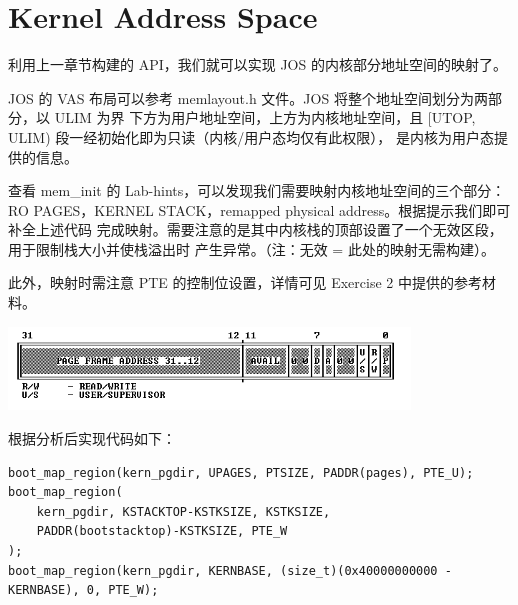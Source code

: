 \documentclass[12pt, letterpaper]{report}
\begin{document}
\chapter[\Large Kernel Address Space]{Kernel Address Space}
利用上一章节构建的 API，我们就可以实现 JOS 的内核部分地址空间的映射了。\par 
JOS 的 VAS 布局可以参考 memlayout.h 文件。JOS 将整个地址空间划分为两部分，以 ULIM 为界
下方为用户地址空间，上方为内核地址空间，且 [UTOP, ULIM) 段一经初始化即为只读（内核/用户态均仅有此权限），
是内核为用户态提供的信息。\par 
\quad \par 
{}
\quad \par 
查看 mem\_init 的 Lab-hints，可以发现我们需要映射内核地址空间的三个部分：
RO PAGES，KERNEL STACK，remapped physical address。根据提示我们即可补全上述代码
完成映射。需要注意的是其中内核栈的顶部设置了一个无效区段，用于限制栈大小并使栈溢出时
产生异常。（注：无效 = 此处的映射无需构建）。\par 
此外，映射时需注意 PTE 的控制位设置，详情可见 Exercise 2 中提供的参考材料。\par
\includegraphics[width=0.8\textwidth]{PTE}
\quad \par 
\noindent 根据分析后实现代码如下：\par 
\lstset{style=CStyle}
\setmainfont{Consolas}
\begin{lstlisting}
boot_map_region(kern_pgdir, UPAGES, PTSIZE, PADDR(pages), PTE_U);
boot_map_region(
    kern_pgdir, KSTACKTOP-KSTKSIZE, KSTKSIZE, 
    PADDR(bootstacktop)-KSTKSIZE, PTE_W
);
boot_map_region(kern_pgdir, KERNBASE, (size_t)(0x40000000000 - KERNBASE), 0, PTE_W);
\end{lstlisting}
\setmainfont{Times New Roman}
\end{document}
